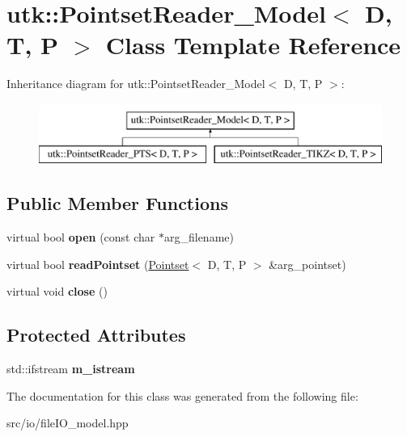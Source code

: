 \hypertarget{classutk_1_1PointsetReader__Model}{\section{utk\-:\-:Pointset\-Reader\-\_\-\-Model$<$ D, T, P $>$ Class Template Reference}
\label{classutk_1_1PointsetReader__Model}
}
Inheritance diagram for utk\-:\-:Pointset\-Reader\-\_\-\-Model$<$ D, T, P $>$\-:\begin{figure}[H]
\begin{center}
\leavevmode
\includegraphics[height=2.000000cm]{classutk_1_1PointsetReader__Model}
\end{center}
\end{figure}
\subsection*{Public Member Functions}
\begin{DoxyCompactItemize}
\item 
\hypertarget{classutk_1_1PointsetReader__Model_accb3e89acb255f8e5349ea2987b2f9b6}{virtual bool {\bfseries open} (const char $\ast$arg\-\_\-filename)}\label{classutk_1_1PointsetReader__Model_accb3e89acb255f8e5349ea2987b2f9b6}

\item 
\hypertarget{classutk_1_1PointsetReader__Model_a243cfb7a69a55db9463e8781cc5edbc4}{virtual bool {\bfseries read\-Pointset} (\hyperlink{classutk_1_1Pointset}{Pointset}$<$ D, T, P $>$ \&arg\-\_\-pointset)}\label{classutk_1_1PointsetReader__Model_a243cfb7a69a55db9463e8781cc5edbc4}

\item 
\hypertarget{classutk_1_1PointsetReader__Model_a471422af0657b6c7b5d67176a71330d1}{virtual void {\bfseries close} ()}\label{classutk_1_1PointsetReader__Model_a471422af0657b6c7b5d67176a71330d1}

\end{DoxyCompactItemize}
\subsection*{Protected Attributes}
\begin{DoxyCompactItemize}
\item 
\hypertarget{classutk_1_1PointsetReader__Model_a4dc80773e522101bcf33ad9e481acf88}{std\-::ifstream {\bfseries m\-\_\-istream}}\label{classutk_1_1PointsetReader__Model_a4dc80773e522101bcf33ad9e481acf88}

\end{DoxyCompactItemize}


The documentation for this class was generated from the following file\-:\begin{DoxyCompactItemize}
\item 
src/io/file\-I\-O\-\_\-model.\-hpp\end{DoxyCompactItemize}
